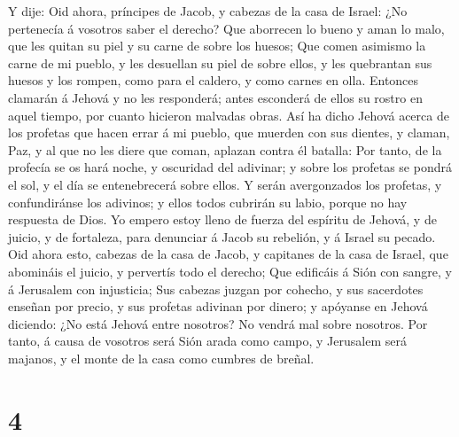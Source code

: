 Y dije: Oid ahora, príncipes de Jacob, y cabezas de la casa
de Israel: ¿No pertenecía á vosotros saber el derecho?  Que
aborrecen lo bueno y aman lo malo, que les quitan su piel y su carne de
sobre los huesos;  Que comen asimismo la carne de mi pueblo,
y les desuellan su piel de sobre ellos, y les quebrantan sus huesos y
los rompen, como para el caldero, y como carnes en olla. 
Entonces clamarán á Jehová y no les responderá; antes esconderá de ellos
su rostro en aquel tiempo, por cuanto hicieron malvadas obras.
 Así ha dicho Jehová acerca de los profetas que hacen errar
á mi pueblo, que muerden con sus dientes, y claman, Paz, y al que no les
diere que coman, aplazan contra él batalla:  Por tanto, de
la profecía se os hará noche, y oscuridad del adivinar; y sobre los
profetas se pondrá el sol, y el día se entenebrecerá sobre ellos.
 Y serán avergonzados los profetas, y confundiránse los
adivinos; y ellos todos cubrirán su labio, porque no hay respuesta de
Dios.  Yo empero estoy lleno de fuerza del espíritu de
Jehová, y de juicio, y de fortaleza, para denunciar á Jacob su rebelión,
y á Israel su pecado.  Oid ahora esto, cabezas de la casa de
Jacob, y capitanes de la casa de Israel, que abomináis el juicio, y
pervertís todo el derecho;  Que edificáis á Sión con
sangre, y á Jerusalem con injusticia;  Sus cabezas juzgan
por cohecho, y sus sacerdotes enseñan por precio, y sus profetas
adivinan por dinero; y apóyanse en Jehová diciendo: ¿No está Jehová
entre nosotros? No vendrá mal sobre nosotros.  Por tanto, á
causa de vosotros será Sión arada como campo, y Jerusalem será majanos,
y el monte de la casa como cumbres de breñal.

\hypertarget{section-3}{%
\section{4}\label{section-3}}


